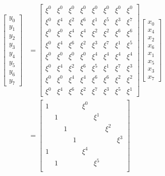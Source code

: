 \documentclass{jsarticle}
\begin{document}
\small

\begin{align*}
  \begin{bmatrix}
    y_0 \\
    y_1 \\
    y_2 \\
    y_3 \\
    y_4 \\
    y_5 \\
    y_6 \\
    y_7
  \end{bmatrix}
  &=
  \begin{bmatrix}
    \xi^0 & \xi^0 & \xi^0 & \xi^0 & \xi^0 & \xi^0 & \xi^0 & \xi^0 \\
    \xi^0 & \xi^4 & \xi^2 & \xi^6 & \xi^1 & \xi^5 & \xi^3 & \xi^7 \\
    \xi^0 & \xi^0 & \xi^4 & \xi^4 & \xi^2 & \xi^2 & \xi^6 & \xi^6 \\
    \xi^0 & \xi^4 & \xi^6 & \xi^2 & \xi^3 & \xi^7 & \xi^1 & \xi^5 \\
    \xi^0 & \xi^0 & \xi^0 & \xi^0 & \xi^4 & \xi^4 & \xi^4 & \xi^4 \\
    \xi^0 & \xi^4 & \xi^2 & \xi^6 & \xi^5 & \xi^1 & \xi^7 & \xi^3 \\
    \xi^0 & \xi^0 & \xi^4 & \xi^4 & \xi^6 & \xi^6 & \xi^2 & \xi^2 \\
    \xi^0 & \xi^4 & \xi^6 & \xi^2 & \xi^7 & \xi^3 & \xi^5 & \xi^1
  \end{bmatrix}
  \begin{bmatrix}
    x_0 \\
    x_4 \\
    x_2 \\
    x_6 \\
    x_1 \\
    x_5 \\
    x_3 \\
    x_7
  \end{bmatrix}
  \\
  &=
  \begin{bmatrix}
    1 &   &   &   & \xi^0 &       &       &       \\
      & 1 &   &   &       & \xi^1 &       &       \\
      &   & 1 &   &       &       & \xi^2 &       \\
      &   &   & 1 &       &       &       & \xi^3 \\
    1 &   &   &   & \xi^4 &       &       &       \\
      & 1 &   &   &       & \xi^5 &       &       \\

\end{bmatrix}
\end{align*}
\end{document}
